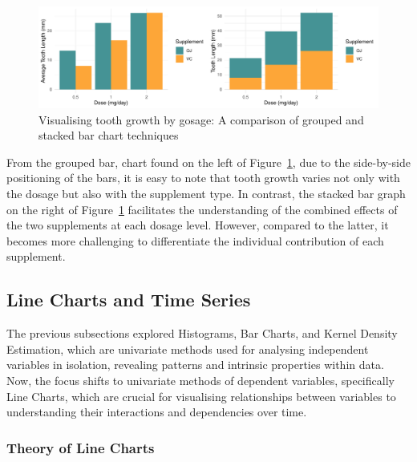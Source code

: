 \documentclass{article}\usepackage[]{graphicx}\usepackage[]{xcolor}
\makeatletter
\def\maxwidth{ %
  \ifdim\Gin@nat@width>\linewidth
    \linewidth
  \else
    \Gin@nat@width
  \fi
}
\newenvironment{knitrout}{}{} %
\numberwithin{equation}{section}
\makeatother
\begin{document}
\begin{knitrout}\scriptsize
{}\color{fgcolor}\begin{figure}[H]

{\centering \includegraphics[width=\maxwidth]{figure/beamer-barcharts-1} 

}

\caption[Visualising tooth growth by gosage]{Visualising tooth growth by gosage: A comparison of grouped and stacked bar chart techniques}\label{fig:barcharts}
\end{figure}

\end{knitrout}

\noindent From the grouped bar, chart found on the left of Figure~\ref{fig:barcharts}, due to the side-by-side positioning of the bars, it is easy to note that tooth growth varies not only with the dosage but also with the supplement type. In contrast, the stacked bar graph on the right of Figure~\ref{fig:barcharts} facilitates the understanding of the combined effects of the two supplements at each dosage level. However, compared to the latter, it becomes more challenging to differentiate the individual contribution of each supplement.

\subsection{Line Charts and Time Series}

\noindent
The previous subsections explored Histograms, Bar Charts, and Kernel Density Estimation, which are univariate methods used for analysing independent variables in isolation, revealing patterns and intrinsic properties within data. Now, the focus shifts to univariate methods of dependent variables, specifically Line Charts, which are crucial for visualising relationships between variables to understanding their interactions and dependencies over time.

\subsubsection{Theory of Line Charts}
\end{document}
